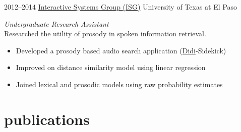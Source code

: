 \documentclass[]{friggeri-cv} %
\begin{document}
\begin{entrylist}
\entry
{2012--2014}
{\href{http://isg.cs.utep.edu/}{Interactive Systems Group  {\normalfont (ISG)}}}
{University of Texas at El Paso}
{\emph{Undergraduate Research Assistant} \\
Researched the utility of prosody in spoken information retrieval.
\begin{itemize}
\item %
Developed a prosody based audio search application (\href{http://www.cs.utep.edu/nigel/didi/}{Didi}-Sidekick)
\end{itemize}
\begin{itemize}
\item Improved on distance similarity model using linear regression
\end{itemize}
\begin{itemize}
\item Joined lexical and prosodic models using raw probability estimates
\end{itemize}}
\end{entrylist}


\section{publications}
\end{document}
